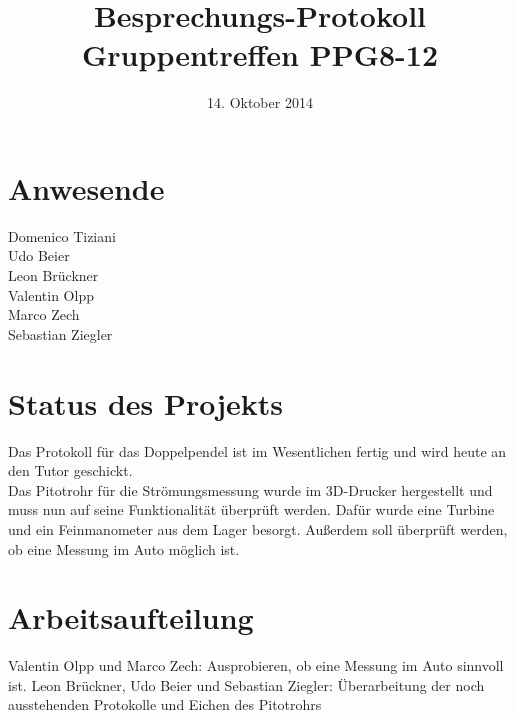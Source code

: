 \documentclass[]{scrartcl}
\begin{document}
\title{Besprechungs-Protokoll Gruppentreffen PPG8-12}
\date{14. Oktober 2014}
\maketitle
\section{Anwesende}
Domenico Tiziani\\
Udo Beier\\
Leon Brückner\\
Valentin Olpp\\
Marco Zech\\
Sebastian Ziegler\\
\section{Status des Projekts}
Das Protokoll für das Doppelpendel ist im Wesentlichen fertig und wird heute an den Tutor geschickt.\\
Das Pitotrohr für die Strömungsmessung wurde im 3D-Drucker hergestellt und muss nun auf seine Funktionalität überprüft werden. Dafür wurde eine Turbine und ein Feinmanometer aus dem Lager besorgt. Außerdem soll überprüft werden, ob eine Messung im Auto möglich ist.
\section{Arbeitsaufteilung}
Valentin Olpp und Marco Zech: Ausprobieren, ob eine Messung im Auto sinnvoll ist.
Leon Brückner, Udo Beier und Sebastian Ziegler: Überarbeitung der noch ausstehenden Protokolle und Eichen des Pitotrohrs
\end{document}
